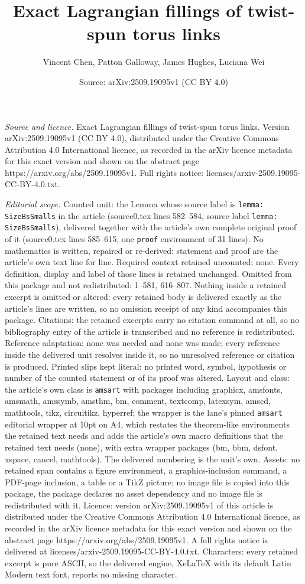 \documentclass[10pt,a4paper]{amsart}
\title[Exact Lagrangian fillings of twist-spun torus links]{Exact Lagrangian fillings of twist-spun torus links}
\author{Vincent Chen, Patton Galloway, James Hughes, Luciana Wei}
\date{Source: arXiv:2509.19095v1 (CC BY 4.0)}
\begin{document}
\maketitle

\noindent\emph{Source and licence.} Exact Lagrangian fillings of twist-spun torus links. Version arXiv:2509.19095v1 (CC BY 4.0), distributed under the Creative Commons Attribution 4.0 International licence, as recorded in the arXiv licence metadata for this exact version and shown on the abstract page https://arxiv.org/abs/2509.19095v1. Full rights notice: licenses/arxiv-2509.19095-CC-BY-4.0.txt.\par\smallskip

\noindent\textit{Editorial scope.} Counted unit: the Lemma whose source label is \texttt{lemma: SizeBsSmalls} in the article (source0.tex lines 582--584, source label \texttt{lemma: SizeBsSmalls}), delivered together with the article's own complete original proof of it (source0.tex lines 585--615, one \texttt{proof} environment of 31 lines). No mathematics is written, repaired or re-derived: statement and proof are the article's own text line for line. Required context retained uncounted: none. Every definition, display and label of those lines is retained unchanged. Omitted from this package and not redistributed: 1--581, 616--807. Nothing inside a retained excerpt is omitted or altered: every retained body is delivered exactly as the article's lines are written, so no omission receipt of any kind accompanies this package. Citations: the retained excerpts carry no citation command at all, so no bibliography entry of the article is transcribed and no reference is redistributed. Reference adaptation: none was needed and none was made; every reference inside the delivered unit resolves inside it, so no unresolved reference or citation is produced. Printed slips kept literal: no printed word, symbol, hypothesis or number of the counted statement or of its proof was altered. Layout and class: the article's own class is \texttt{amsart} with packages including graphicx, amsfonts, amsmath, amssymb, amsthm, bm, comment, textcomp, latexsym, amscd, mathtools, tikz, circuitikz, hyperref; the wrapper is the lane's pinned \texttt{amsart} editorial wrapper at 10pt on A4, which restates the theorem-like environments the retained text needs and adds the article's own macro definitions that the retained text needs (none), with extra wrapper packages (bm, bbm, dsfont, xspace, cancel, mathtools). The delivered numbering is the unit's own. Assets: no retained span contains a figure environment, a graphics-inclusion command, a PDF-page inclusion, a table or a TikZ picture; no image file is copied into this package, the package declares no asset dependency and no image file is redistributed with it. Licence: version arXiv:2509.19095v1 of this article is distributed under the Creative Commons Attribution 4.0 International licence, as recorded in the arXiv licence metadata for this exact version and shown on the abstract page https://arxiv.org/abs/2509.19095v1. A full rights notice is delivered at licenses/arxiv-2509.19095-CC-BY-4.0.txt. Characters: every retained excerpt is pure ASCII, so the delivered engine, XeLaTeX with its default Latin Modern text font, reports no missing character.
\end{document}
